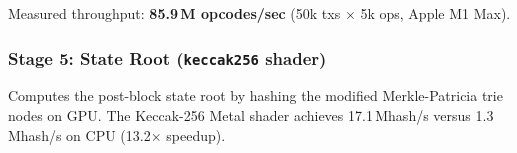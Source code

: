 Measured throughput: \textbf{85.9\,M opcodes/sec} (50k txs $\times$ 5k ops, Apple M1 Max).

\subsubsection{Stage 5: State Root (\texttt{keccak256} shader)}
Computes the post-block state root by hashing the modified Merkle-Patricia trie nodes
on GPU. The Keccak-256 Metal shader achieves 17.1\,Mhash/s versus 1.3\,Mhash/s on CPU
(13.2$\times$ speedup).

